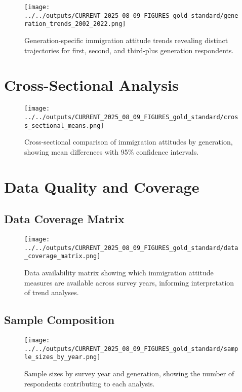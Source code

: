 \documentclass{article}
\begin{document}
\begin{figure}[H]
    \centering
    \texttt{[image: ../../outputs/CURRENT\_2025\_08\_09\_FIGURES\_gold\_standard/generation\_trends\_2002\_2022.png]}
    \caption{Generation-specific immigration attitude trends revealing distinct trajectories for first, second, and third-plus generation respondents.}
    \label{fig:generation_trends}
\end{figure}

\section{Cross-Sectional Analysis}

\begin{figure}[H]
    \centering
    \texttt{[image: ../../outputs/CURRENT\_2025\_08\_09\_FIGURES\_gold\_standard/cross\_sectional\_means.png]}
    \caption{Cross-sectional comparison of immigration attitudes by generation, showing mean differences with 95\% confidence intervals.}
    \label{fig:cross_sectional}
\end{figure}

\section{Data Quality and Coverage}

\subsection{Data Coverage Matrix}

\begin{figure}[H]
    \centering
    \texttt{[image: ../../outputs/CURRENT\_2025\_08\_09\_FIGURES\_gold\_standard/data\_coverage\_matrix.png]}
    \caption{Data availability matrix showing which immigration attitude measures are available across survey years, informing interpretation of trend analyses.}
    \label{fig:coverage}
\end{figure}

\subsection{Sample Composition}

\begin{figure}[H]
    \centering
    \texttt{[image: ../../outputs/CURRENT\_2025\_08\_09\_FIGURES\_gold\_standard/sample\_sizes\_by\_year.png]}
    \caption{Sample sizes by survey year and generation, showing the number of respondents contributing to each analysis.}
    \label{fig:sample_sizes}
\end{figure}
\end{document}
